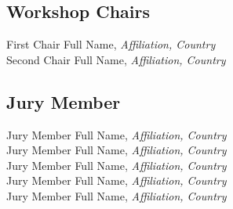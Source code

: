 
\subsection{Workshop Chairs}
First Chair Full Name, \emph{Affiliation, Country}\\
Second Chair Full Name, \emph{Affiliation, Country}



\subsection{Jury Member}
Jury Member Full Name, \emph{Affiliation, Country}\\
Jury Member Full Name, \emph{Affiliation, Country}\\
Jury Member Full Name, \emph{Affiliation, Country}\\
Jury Member Full Name, \emph{Affiliation, Country}\\
Jury Member Full Name, \emph{Affiliation, Country}\\
